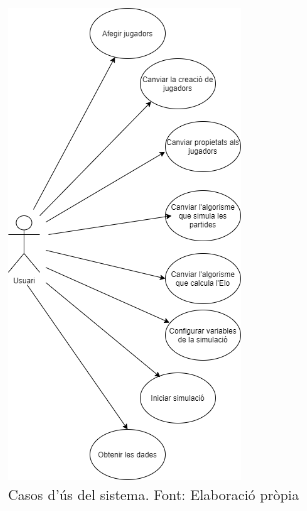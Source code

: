 \documentclass[a4paper]{article}
\newcounter{subsubsubsection}[subsubsection]
\begin{document}
\begin{figure}[H]
    \centering
    \includegraphics[width=0.55\textwidth]{images/Casos d'us.png}
    \caption{Casos d'ús del sistema. Font: Elaboració pròpia}
    \label{fig:EsquemaCasosD'us}
\end{figure}

\newpage
{}
\addtocounter{posCas}{1}

\end{document}
